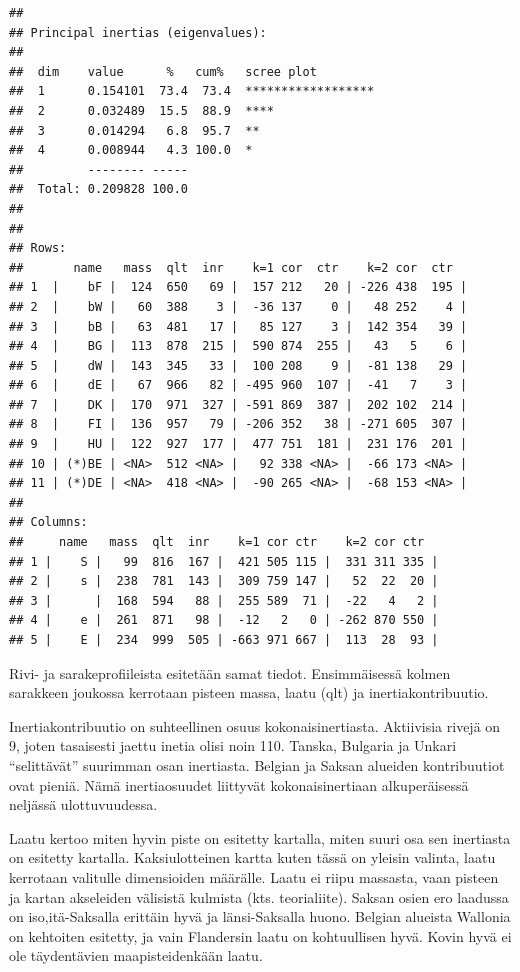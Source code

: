 \documentclass[
  finnish,
]{book}
\begin{document}
\begin{verbatim}
## 
## Principal inertias (eigenvalues):
## 
##  dim    value      %   cum%   scree plot               
##  1      0.154101  73.4  73.4  ******************       
##  2      0.032489  15.5  88.9  ****                     
##  3      0.014294   6.8  95.7  **                       
##  4      0.008944   4.3 100.0  *                        
##         -------- -----                                 
##  Total: 0.209828 100.0                                 
## 
## 
## Rows:
##       name   mass  qlt  inr    k=1 cor  ctr    k=2 cor  ctr  
## 1  |    bF |  124  650   69 |  157 212   20 | -226 438  195 |
## 2  |    bW |   60  388    3 |  -36 137    0 |   48 252    4 |
## 3  |    bB |   63  481   17 |   85 127    3 |  142 354   39 |
## 4  |    BG |  113  878  215 |  590 874  255 |   43   5    6 |
## 5  |    dW |  143  345   33 |  100 208    9 |  -81 138   29 |
## 6  |    dE |   67  966   82 | -495 960  107 |  -41   7    3 |
## 7  |    DK |  170  971  327 | -591 869  387 |  202 102  214 |
## 8  |    FI |  136  957   79 | -206 352   38 | -271 605  307 |
## 9  |    HU |  122  927  177 |  477 751  181 |  231 176  201 |
## 10 | (*)BE | <NA>  512 <NA> |   92 338 <NA> |  -66 173 <NA> |
## 11 | (*)DE | <NA>  418 <NA> |  -90 265 <NA> |  -68 153 <NA> |
## 
## Columns:
##     name   mass  qlt  inr    k=1 cor ctr    k=2 cor ctr  
## 1 |    S |   99  816  167 |  421 505 115 |  331 311 335 |
## 2 |    s |  238  781  143 |  309 759 147 |   52  22  20 |
## 3 |      |  168  594   88 |  255 589  71 |  -22   4   2 |
## 4 |    e |  261  871   98 |  -12   2   0 | -262 870 550 |
## 5 |    E |  234  999  505 | -663 971 667 |  113  28  93 |
\end{verbatim}

Rivi- ja sarakeprofiileista esitetään samat tiedot. Ensimmäisessä kolmen
sarakkeen joukossa kerrotaan pisteen massa, laatu (qlt) ja inertiakontribuutio.

Inertiakontribuutio on suhteellinen osuus kokonaisinertiasta. Aktiivisia rivejä on 9,
joten tasaisesti jaettu inetia olisi noin 110. Tanska, Bulgaria ja Unkari ``selittävät''
suurimman osan inertiasta. Belgian ja Saksan alueiden kontribuutiot ovat pieniä.
Nämä inertiaosuudet liittyvät kokonaisinertiaan alkuperäisessä neljässä ulottuvuudessa.

Laatu kertoo miten hyvin piste on esitetty kartalla, miten suuri osa sen
inertiasta on esitetty kartalla. Kaksiulotteinen kartta kuten tässä on yleisin
valinta, laatu kerrotaan valitulle dimensioiden määrälle. Laatu ei riipu massasta,
vaan pisteen ja kartan akseleiden välisistä kulmista (kts. teorialiite). Saksan
osien ero laadussa on iso,itä-Saksalla erittäin hyvä ja länsi-Saksalla huono.
Belgian alueista Wallonia on kehtoiten esitetty, ja vain Flandersin laatu on
kohtuullisen hyvä. Kovin hyvä ei ole täydentävien maapisteidenkään laatu.
\end{document}
